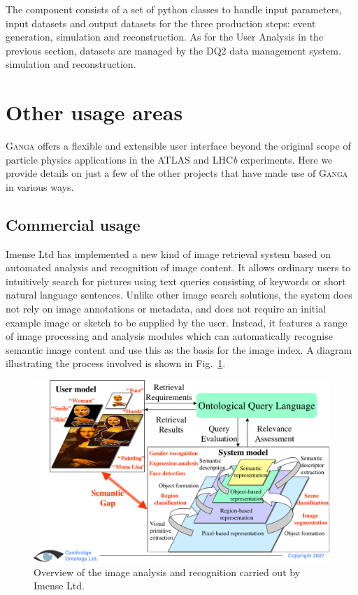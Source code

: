 \documentclass{elsart}
\def\lhcb {LHC{\em b\/}\xspace}
\def\atlas {ATLAS\xspace}
\def\ganga {\textsc{Ganga}\xspace}
\begin{document}
The component consists of a set of python classes to handle input
parameters, input datasets and output datasets for the three
production steps: event generation, simulation and reconstruction. As
for the User Analysis in the previous section, datasets are managed by
the DQ2 data management system.  simulation and reconstruction.

\section{Other usage areas}
\label{sec:other}
\ganga offers a flexible and extensible user interface beyond the original scope of particle physics
applications in the \atlas and \lhcb experiments. Here we provide
details on just a few of the other projects that have made use of \ganga in
various ways.

\subsection{Commercial usage}
\label{sec:Imense}
Imense Ltd has implemented a new kind of image retrieval system based on
automated analysis and recognition of image content. It allows ordinary users
to intuitively search for pictures using text queries consisting of keywords
or short natural language sentences. Unlike other image search solutions, the
system does not rely on image annotations or metadata, and does not require an
initial example image or sketch to be supplied by the user. Instead, it
features a range of image processing and analysis modules which can
automatically recognise semantic image content and use this as the basis for
the image index. A diagram illustrating the process involved is shown in
Fig.~\ref{fig:camtologytech}.
\begin{figure}[htb]
  \begin{center}
    \includegraphics[width=0.85 \textwidth]{camtologyfigure.pdf}
  \end{center}
  \caption{Overview of the image analysis and recognition carried
    out by Imense Ltd.}
  \label{fig:camtologytech}
\end{figure}
\end{document}
